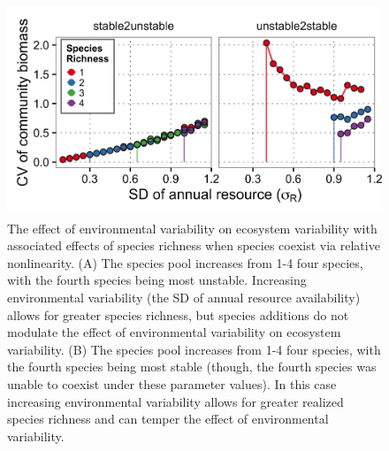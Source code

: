 \documentclass[12pt,]{article}
\begin{document}
\begin{figure}[!ht]
  \centering
      \includegraphics[height=2.5in]{./components/relative_nonlinearity_div+envar.png}
  \caption{The effect of environmental variability on ecosystem variability with associated effects of species richness when species coexist via relative nonlinearity. (A) The species pool increases from 1-4 four species, with the fourth species being most unstable. Increasing environmental variability (the SD of annual resource availability) allows for greater species richness, but species additions do not modulate the effect of environmental variability on ecosystem variability. (B) The species pool increases from 1-4 four species, with the fourth species being most stable (though, the fourth species was unable to coexist under these parameter values). In this case increasing environmental variability allows for greater realized species richness and can temper the effect of environmental variability.}
\end{figure}

\newpage{}
\end{document}
